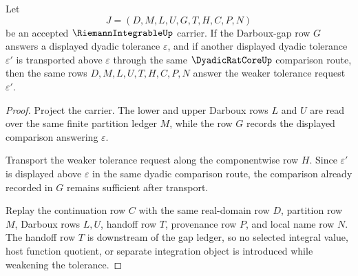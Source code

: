 \begin{theorem}
\label{thm:riemann-integrable-gap-ledger-monotonicity}
Let
$$
J=(D,M,L,U,G,T,H,C,P,N)
$$
be an accepted $\RiemannIntegrableUp$ carrier. If the Darboux-gap row $G$ answers a displayed dyadic tolerance $\varepsilon$, and if another displayed dyadic tolerance $\varepsilon'$ is transported above $\varepsilon$ through the same $\DyadicRatCoreUp$ comparison route, then the same rows $D,M,L,U,T,H,C,P,N$ answer the weaker tolerance request $\varepsilon'$.
\end{theorem}
\begin{proof}
Project the carrier. The lower and upper Darboux rows $L$ and $U$ are read over the same finite partition ledger $M$, while the row $G$ records the displayed comparison answering $\varepsilon$.

Transport the weaker tolerance request along the componentwise row $H$. Since $\varepsilon'$ is displayed above $\varepsilon$ in the same dyadic comparison route, the comparison already recorded in $G$ remains sufficient after transport.

Replay the continuation row $C$ with the same real-domain row $D$, partition row $M$, Darboux rows $L,U$, handoff row $T$, provenance row $P$, and local name row $N$. The handoff row $T$ is downstream of the gap ledger, so no selected integral value, host function quotient, or separate integration object is introduced while weakening the tolerance.
\end{proof}


\begin{closurestatus}{\RiemannIntegrableUp}
  \theoryclosure{\seedClosure}
  \formalstatus{\unformalizedV}
\end{closurestatus}
